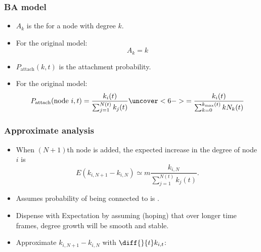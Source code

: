 \begin{frame}[label=]
 \frametitle{BA model}  

 \begin{block}{}
   \begin{itemize}
   \item<1->
      $A_k$ is the 
     for a node with degree $k$.
   \item<2->
     For the original model:
     $$ A_k = k$$
   \item<3->
      $P_{\textrm{attach}}(k,t)$ 
     is the attachment probability.
   \item<4->
     For the original model:
     $$
     P_{\textrm{attach}}(\mbox{node $i$},t)
     =
     \frac{k_i(t)}
     {
       \sum_{j=1}^{N(t)} k_j(t)
     }
     \uncover<6->{
       =
       \frac{k_i(t)}
       {
         \sum_{k=0}^{k_{\textrm{max}}(t)} k N_k(t)
       }
     }
     $$
   \end{itemize}
 \end{block}

\end{frame}

\begin{frame}[label=]
 \frametitle{Approximate analysis}  

 \begin{block}{}
 \begin{itemize}
 \item<1->
   When $(N+1)$th node is added, 
   the expected increase in the degree of node $i$ is 
   $$
   E(k_{i,N+1} - k_{i,N}) 
   \simeq 
   m
   \frac{k_{i,N}}
   {
     \sum_{j=1}^{N(t)} k_j(t)
   }.
   $$
 \item<2->
   Assumes probability of being connected to is .
 \item<3->
   Dispense with Expectation by assuming (hoping)
   that over longer time frames, degree growth will
   be smooth and stable.
 \item<4->
   Approximate 
   $k_{i,N+1} - k_{i,N}$ with $\diff{}{t} k_{i,t}$:
 \end{itemize}
 \end{block}


\end{frame}

